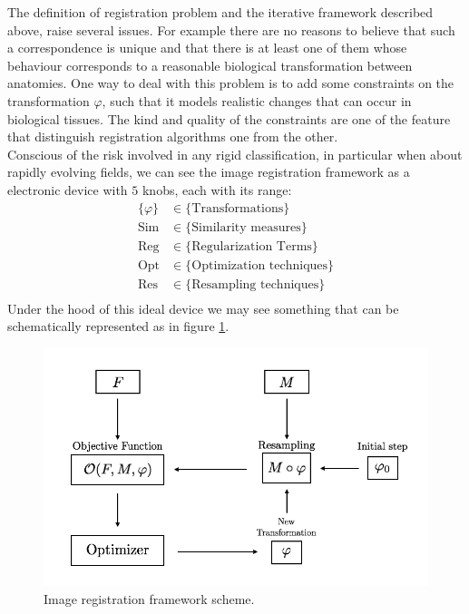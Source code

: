 The definition of registration problem and the iterative framework described above, raise several issues. For example there are no reasons to believe that such a correspondence is unique and that there is at least one of them whose behaviour corresponds to a reasonable biological transformation between anatomies. One way to deal with this problem is to add some constraints on the transformation $\varphi$, such that it models realistic changes that can occur in biological tissues. The kind and quality of the constraints are one of the feature that distinguish registration algorithms one from the other. \\
Conscious of the risk involved in any rigid classification, in particular when about rapidly evolving fields, we can see the image registration framework as a electronic device with $5$ knobs, each with its range:
\begin{align*}
\{  \varphi \} &\in \{ \text{Transformations}\}\\
\text{Sim} &\in \{ \text{Similarity measures}\}\\
\text{Reg} &\in \{ \text{Regularization Terms}\}\\
\text{Opt} &\in \{ \text{Optimization techniques}\}\\
\text{Res} &\in \{ \text{Resampling techniques}\}\\
\end{align*}
Under the hood of this ideal device we may see something that can be schematically represented as in figure \ref{fig:iterative_algorithm_scheme}.

\begin{figure}[!ht]
	\centering
	\includegraphics[scale=0.35]{figures/iterative_algorithm.png}
	\caption{Image registration framework scheme.}
	\label{fig:iterative_algorithm_scheme}
\end{figure}

